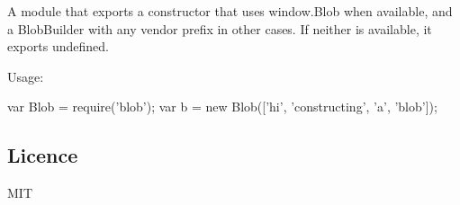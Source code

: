 A module that exports a constructor that uses window.\+Blob when available, and a Blob\+Builder with any vendor prefix in other cases. If neither is available, it exports undefined.

Usage\+:


\begin{DoxyCode}
var Blob = require('blob');
var b = new Blob(['hi', 'constructing', 'a', 'blob']);
\end{DoxyCode}


\subsection*{Licence}

M\+IT 